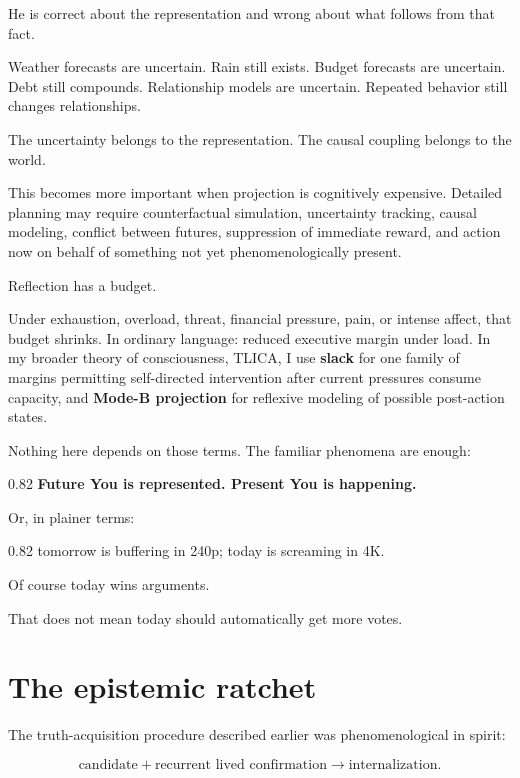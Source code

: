 \documentclass[10pt,letterpaper]{article}
\newenvironment{paperbody}
  {\begingroup\justifying}
  {\par\endgroup}
\newenvironment{voicebox}
  {\Needspace{3.5\baselineskip}\par\vspace{0.22em}\begin{center}\begingroup
   \begin{lrbox}{\voiceboxsave}\begin{varwidth}{0.82\linewidth}
   \small\rmfamily\upshape\RaggedRight}
  {\end{varwidth}\end{lrbox}\fbox{\usebox{\voiceboxsave}}
   \endgroup\end{center}\vspace{0.22em}}
\let\oldsection\section
\renewcommand{\section}{\Needspace{6\baselineskip}\oldsection}
\begin{document}
\begin{paperbody}
He is correct about the representation and wrong about what follows from
that fact.

Weather forecasts are uncertain. Rain still exists. Budget forecasts are
uncertain. Debt still compounds. Relationship models are uncertain.
Repeated behavior still changes relationships.

The uncertainty belongs to the representation. The causal coupling
belongs to the world.

This becomes more important when projection is cognitively expensive.
Detailed planning may require counterfactual simulation, uncertainty
tracking, causal modeling, conflict between futures, suppression of
immediate reward, and action now on behalf of something not yet
phenomenologically present.

Reflection has a budget.

Under exhaustion, overload, threat, financial pressure, pain, or intense
affect, that budget shrinks. In ordinary language: reduced executive
margin under load. In my broader theory of consciousness, TLICA, I use
\textbf{slack} for one family of margins permitting self-directed
intervention after current pressures consume capacity, and
\textbf{Mode-B projection} for reflexive modeling of possible
post-action states.

Nothing here depends on those terms. The familiar phenomena are enough:

\begin{voicebox}
\textbf{Future You is represented. Present You is happening.}
\end{voicebox}

Or, in plainer terms:

\begin{voicebox}
tomorrow is buffering in 240p; today is screaming in 4K.
\end{voicebox}

Of course today wins arguments.

That does not mean today should automatically get more votes.

\section{The epistemic ratchet}\label{the-epistemic-ratchet}

The truth-acquisition procedure described earlier was phenomenological
in spirit:

\[
\text{candidate}
+
\text{recurrent lived confirmation}
\to
\text{internalization}.
\]


\end{paperbody}
\end{document}
